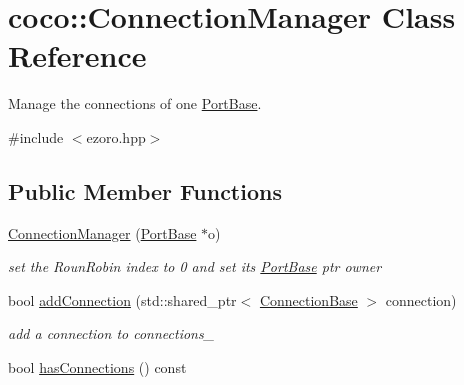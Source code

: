 \hypertarget{classcoco_1_1_connection_manager}{\section{coco\-:\-:Connection\-Manager Class Reference}
\label{classcoco_1_1_connection_manager}
}


Manage the connections of one \hyperlink{classcoco_1_1_port_base}{Port\-Base}.  




{\ttfamily \#include $<$ezoro.\-hpp$>$}

\subsection*{Public Member Functions}
\begin{DoxyCompactItemize}
\item 
\hypertarget{classcoco_1_1_connection_manager_acc77c57271baa8de5d3b20a10497a55d}{\hyperlink{classcoco_1_1_connection_manager_acc77c57271baa8de5d3b20a10497a55d}{Connection\-Manager} (\hyperlink{classcoco_1_1_port_base}{Port\-Base} $\ast$o)}\label{classcoco_1_1_connection_manager_acc77c57271baa8de5d3b20a10497a55d}

\begin{DoxyCompactList}\small\item\em set the Roun\-Robin index to 0 and set its \hyperlink{classcoco_1_1_port_base}{Port\-Base} ptr owner \end{DoxyCompactList}\item 
\hypertarget{classcoco_1_1_connection_manager_acc1eea2a62f85fb48aa3d7bce1e7e272}{bool \hyperlink{classcoco_1_1_connection_manager_acc1eea2a62f85fb48aa3d7bce1e7e272}{add\-Connection} (std\-::shared\-\_\-ptr$<$ \hyperlink{classcoco_1_1_connection_base}{Connection\-Base} $>$ connection)}\label{classcoco_1_1_connection_manager_acc1eea2a62f85fb48aa3d7bce1e7e272}

\begin{DoxyCompactList}\small\item\em add a connection to {\ttfamily connections\-\_\-} \end{DoxyCompactList}\item 
\hypertarget{classcoco_1_1_connection_manager_a81502d9aeb59d1c0b74d69e598f38d2b}{bool \hyperlink{classcoco_1_1_connection_manager_a81502d9aeb59d1c0b74d69e598f38d2b}{has\-Connections} () const }\label{classcoco_1_1_connection_manager_a81502d9aeb59d1c0b74d69e598f38d2b}


\end{DoxyCompactItemize}
